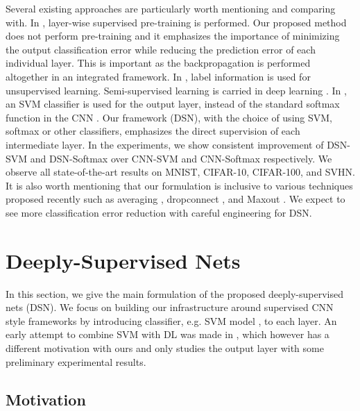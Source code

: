 \documentclass{article} %
\begin{document}
Several existing approaches are particularly worth mentioning and comparing with. In \cite{pretrain}, layer-wise supervised pre-training is performed. Our proposed method does not perform pre-training and it emphasizes the importance of minimizing the output classification error while reducing the prediction error of each individual layer. This is important as the backpropagation is performed altogether in an integrated framework.
In \cite{Snoek12}, label information is used for unsupervised learning. Semi-supervised learning is carried in deep learning \cite{Weston12}.
In \cite{Tang13}, an SVM classifier is used for the output layer, instead of the standard softmax function in the CNN \cite{CNN}. Our framework (DSN), with the choice of using SVM, softmax or other classifiers, emphasizes the direct supervision of each intermediate layer. In the experiments, we show consistent improvement of DSN-SVM and DSN-Softmax over CNN-SVM and CNN-Softmax respectively. 
We observe all state-of-the-art results on MNIST, CIFAR-10, CIFAR-100, and SVHN. It is also worth mentioning that our formulation is inclusive to various techniques proposed recently such as averaging \cite{mulCOL}, dropconnect \cite{dropcon}, and Maxout \cite{maxout}. We expect to see more classification error reduction with careful engineering for DSN.

\section{Deeply-Supervised Nets}
In this section, we give the main formulation of the proposed deeply-supervised nets (DSN). We focus on building our infrastructure around supervised CNN style frameworks \cite{CNN,DeCAF,theano} by introducing classifier, e.g. SVM model \cite{vapnik}, to each layer. An early attempt to combine SVM with DL was made in \cite{Tang13}, which however has a different motivation with ours and only studies the output layer with some preliminary experimental results.

\subsection{Motivation}
\end{document}
